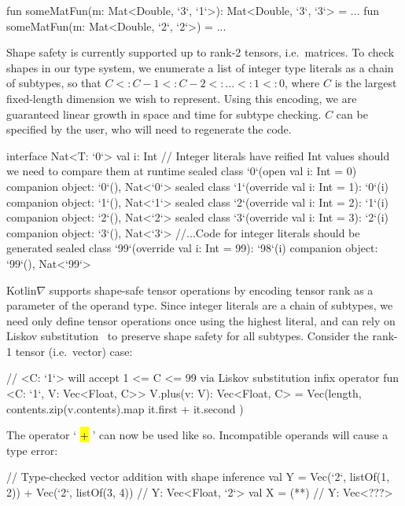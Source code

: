 \documentclass[12pt,initial,twoside,maitrise]{dms}
\makeatletter
\def\uwave{\bgroup \markoverwith{\lower3.5\p@\hbox{\sixly \textcolor{red}{\char58}}}\ULon}
\newcommand{\inline}[1]{%
\begingroup%
\sethlcolor{slightgray}%
\hl{\ttfamily\small #1}%
\endgroup
}
\numberwithin{equation}{section}
\numberwithin{table}{chapter}
\numberwithin{figure}{chapter}
\makeatother
\begin{document}
%
\begin{kotlinlisting}
fun someMatFun(m: Mat<Double, `3`, `1`>): Mat<Double, `3`, `3`> = ...
fun someMatFun(m: Mat<Double, `2`, `2`>) = ...
\end{kotlinlisting}
%
Shape safety is currently supported up to rank-2 tensors, i.e.\ matrices. To check shapes in our type system, we enumerate a list of integer type literals as a chain of subtypes, so that $C <: C - 1 <: C - 2 <: \dots <: 1 <: 0$, where $C$ is the largest fixed-length dimension we wish to represent. Using this encoding, we are guaranteed linear growth in space and time for subtype checking. $C$ can be specified by the user, who will need to regenerate the code.
%
\begin{kotlinlisting}[caption={Shape safe tensor addition for rank-1 tensors, $\forall C\leq2.$}]
interface Nat<T: `0`> { val i: Int }
// Integer literals have reified Int values should we need to compare them at runtime
sealed class `0`(open val i: Int = 0) { companion object: `0`(), Nat<`0`> }
sealed class `1`(override val i: Int = 1): `0`(i) { companion object: `1`(), Nat<`1`> }
sealed class `2`(override val i: Int = 2): `1`(i) { companion object: `2`(), Nat<`2`> }
sealed class `3`(override val i: Int = 3): `2`(i) { companion object: `3`(), Nat<`3`> }
//...Code for integer literals should be generated
sealed class `99`(override val i: Int = 99): `98`(i) { companion object: `99`(), Nat<`99`> }
\end{kotlinlisting}
%
Kotlin$\nabla$ supports shape-safe tensor operations by encoding tensor rank as a parameter of the operand type. Since integer literals are a chain of subtypes, we need only define tensor operations once using the highest literal, and can rely on Liskov substitution~\citep{liskov1987} to preserve shape safety for all subtypes. Consider the rank-1 tensor (i.e.\ vector) case:
%
\begin{kotlinlisting}
// <C: `1`> will accept 1 <= C <= 99 via Liskov substitution
infix operator fun <C: `1`, V: Vec<Float, C>> V.plus(v: V): Vec<Float, C> =
    Vec(length, contents.zip(v.contents).map { it.first + it.second })
\end{kotlinlisting}
%
The operator `\inline{+}' can now be used like so. Incompatible operands will cause a type error:
%
\begin{kotlinlisting}
// Type-checked vector addition with shape inference
val Y = Vec(`2`, listOf(1, 2)) + Vec(`2`, listOf(3, 4)) // Y: Vec<Float, `2`>
val X = (*\uwave{Vec(`2`, listOf(1, 2)) + Vec(`5`, listOf(3, 4, 1, 2, 4))}*) // Y: Vec<???>
\end{kotlinlisting}
\end{document}
